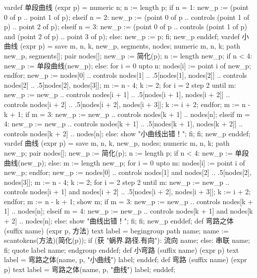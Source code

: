 \startMPinclusions[+]
vardef 单段曲线 (expr p) =
  numeric n; n := length p;
  if n = 1:
    new_p := (point 0 of p .. point 1 of p);
  elseif n = 2:
    new_p := (point 0 of p .. controls (point 1 of p) .. point 2 of p);
  elseif n = 3:
    new_p := (point 0 of p .. 
        controls (point 1 of p) and (point 2 of p) 
        .. point 3 of p);
  else:
    new_p := p;
  fi;
  new_p
enddef;
vardef 小曲线 (expr p) =
  save m, n, k, new_p, segments, nodes;
  numeric m, n, k; path new_p, segments[]; pair nodes[];
  new_p := 简化(p);
  n := length new_p;
  if n < 4:
    new_p := 单段曲线(new_p);
  else:
    for i = 0 upto n:
      nodes[i] := point i of new_p;
    endfor;
    new_p := nodes[0] 
          .. controls nodes[1]
          .. .5[nodes[1], nodes[2]]
          .. controls nodes[2]
          .. .5[nodes[2], nodes[3]];
    m := n - 4;
    k := 2;
    for i = 2 step 2 until m:
      new_p := new_p
          .. controls nodes[i + 1]
          .. .5[nodes[i + 1], nodes[i + 2]]
          .. controls nodes[i + 2]
          .. .5[nodes[i + 2], nodes[i + 3]];
      k := i + 2;
    endfor;
    m := n - k + 1;
    if m = 3:
      new_p := new_p .. controls nodes[k + 1] .. nodes[n];
    elseif m = 4:
      new_p := new_p 
        .. controls nodes[k + 1]
        .. .5[nodes[k + 1], nodes[k + 2]]
        .. controls nodes[k + 2]
        .. nodes[n];
    else:
      show "小曲线出错！";
    fi;
  fi;
  new_p
enddef;
vardef 曲线 (expr p) =
  save m, n, k, new_p, nodes;
  numeric m, n, k; path new_p; pair nodes[];
  new_p := 简化(p);
  n := length p;
  if n < 4:
    new_p := 单段曲线(new_p);
  else:
    m := length new_p;
    for i = 0 upto m:
      nodes[i] := point i of new_p;
    endfor;
    new_p := nodes[0] 
      .. controls nodes[1] and nodes[2] 
      .. .5[nodes[2], nodes[3]];
    m := n - 4;
    k := 2;
    for i = 2 step 2 until m:
      new_p := new_p 
        .. controls nodes[i + 1] and nodes[i + 2] 
        .. .5[nodes[i + 2], nodes[i + 3]];
      k := i + 2;
    endfor;
    m := n - k + 1;
    show m;
    if m = 3:
      new_p := new_p .. controls nodes[k + 1] .. nodes[n];
    elseif m = 4:
      new_p := new_p 
        .. controls nodes[k + 1] and nodes[k + 2]
        .. nodes[n];
    else:
      show "曲线出错！";
    fi;
  fi;
  new_p
enddef;
def 弯路之体 (suffix name) (expr p, 方法) text label =
  begingroup
  path name; name := scantokens(方法)(简化(p));
  if (获 "蜗界.路径.有向"):
    流向 name;
  else:
    串联 name;
  fi;
  quote label name;
  endgroup
enddef;
def 小弯路 (suffix name) (expr p) text label =
  弯路之体(name, p, "小曲线") label;
enddef;
def 弯路 (suffix name) (expr p) text label =
  弯路之体(name, p, "曲线") label;
enddef;
\stopMPinclusions

